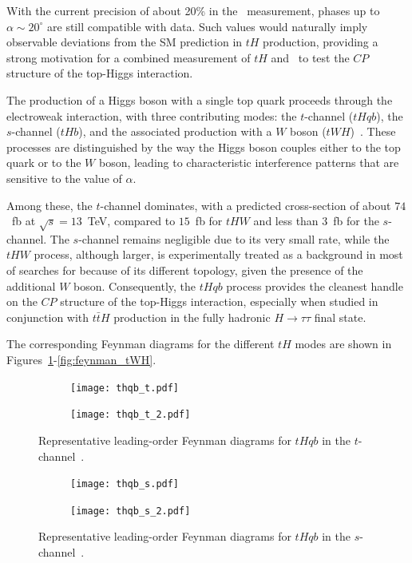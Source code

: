 With the current precision of about 20\% in the \ttH\ measurement, phases up to $\alpha \sim 20^{\circ}$ are still compatible with data. 
Such values would naturally imply observable deviations from the SM prediction in $tH$ production, providing a strong motivation for a combined measurement of $tH$ and \ttH\ to test the $CP$ structure of the top-Higgs interaction.

The production of a Higgs boson with a single top quark proceeds through the electroweak interaction, with three contributing modes: the $t$-channel ($tHqb$), the $s$-channel ($tHb$), and the associated production with a $W$ boson ($tWH$)~\cite{demartin2015,Demartin_2017}. These processes are distinguished by the way the Higgs boson couples either to the top quark or to the $W$ boson, leading to characteristic interference patterns that are sensitive to the value of $\alpha$. 

Among these, the $t$-channel dominates, with a predicted cross-section of about $74$~fb at $\sqrt{s}=13$~TeV, compared to $15$~fb for $tHW$ and less than $3$~fb for the $s$-channel. The $s$-channel remains negligible due to its very small rate, while the $tHW$ process, although larger, is experimentally treated as a background in most of searches for \thqb because of its different topology, given the presence of the additional $W$ boson. Consequently, the $tHqb$ process provides the cleanest handle on the $CP$ structure of the top-Higgs interaction, especially when studied in conjunction with $t\bar{t}H$ production in the fully hadronic $H \to \tau \tau$ final state.

The corresponding Feynman diagrams for the different $tH$ modes are shown in Figures~\ref{fig:feynman_tH_t}-\ref{fig:feynman_tWH}.

\begin{figure}[htbp]
  \centering
  \begin{subfigure}[b]{0.4\textwidth}
    \centering
    \texttt{[image: thqb\_t.pdf]}
  \end{subfigure}
  \begin{subfigure}[b]{0.4\textwidth}
    \centering
    \texttt{[image: thqb\_t\_2.pdf]}
  \end{subfigure}
  \caption{Representative leading-order Feynman diagrams for $tHqb$ in the $t$-channel~\cite{Barger_2010}.}
  \label{fig:feynman_tH_t}
\end{figure}


\begin{figure}[htbp]
  \centering
  \begin{subfigure}[b]{0.4\textwidth}
    \centering
    \texttt{[image: thqb\_s.pdf]}
  \end{subfigure}
  \begin{subfigure}[b]{0.4\textwidth}
    \centering
    \texttt{[image: thqb\_s\_2.pdf]}
  \end{subfigure}
  \caption{Representative leading-order Feynman diagrams for $tHqb$ in the $s$-channel~\cite{Barger_2010}.}
  \label{fig:feynman_tH_s}
\end{figure}


